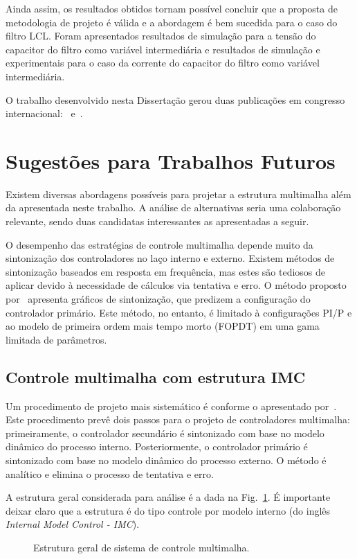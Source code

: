   Ainda assim, os resultados obtidos tornam possível concluir que a proposta de metodologia de projeto é válida e a abordagem é bem sucedida para o caso do filtro LCL. Foram apresentados resultados de simulação para a tensão do capacitor do filtro como variável intermediária e resultados de simulação e experimentais para o caso da corrente do capacitor do filtro como variável intermediária.

  O trabalho desenvolvido nesta Dissertação gerou duas publicações em congresso internacional:~\cite{ref:IECON_2012} e~\cite{ref:IECON_2013}.

\section{Sugestões para Trabalhos Futuros}

  Existem diversas abordagens possíveis para projetar a estrutura multimalha além da apresentada neste trabalho. A análise de alternativas seria uma colaboração relevante, sendo duas candidatas interessantes as apresentadas a seguir.

  O desempenho das estratégias de controle multimalha depende muito da sintonização dos controladores no laço interno e externo. Existem métodos de sintonização baseados em resposta em frequência, mas estes são tediosos de aplicar devido à necessidade de cálculos via tentativa e erro. O método proposto por~\cite{ref:KRISHNA} apresenta gráficos de sintonização, que predizem a configuração do controlador primário. Este método, no entanto, é limitado à configurações PI/P e ao modelo de primeira ordem mais tempo morto (FOPDT) em uma gama limitada de parâmetros.

  \subsection{Controle multimalha com estrutura IMC}

  Um procedimento de projeto mais sistemático é conforme o apresentado por~\cite{ref:LEE}. Este procedimento prevê dois passos para o projeto de controladores multimalha: primeiramente, o controlador secundário é sintonizado com base no modelo dinâmico do processo interno. Posteriormente, o controlador primário é sintonizado com base no modelo dinâmico do processo externo. O método é analítico e elimina o processo de tentativa e erro.

  A estrutura geral considerada para análise é a dada na
  Fig.~\ref{fig:multiloop_lee}. É importante deixar claro que a estrutura é do tipo controle por modelo interno (do inglês \emph{Internal Model Control - IMC}).
  \begin{figure}[htb]
    \centering
      \def\svgwidth{\textwidth}
      
    \renewcommand\figurename{Fig.}
    \caption{Estrutura geral de sistema de controle multimalha.}
    \label{fig:multiloop_lee}
  \end{figure}

